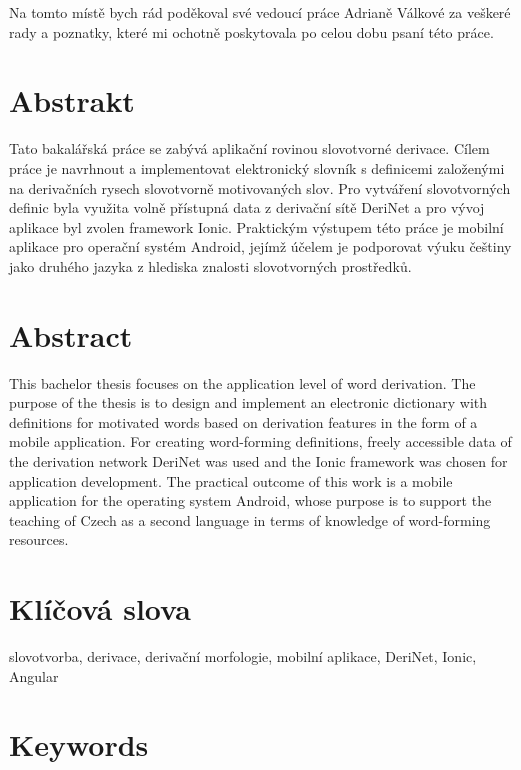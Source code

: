 \documentclass[a4paper,12pt,openany,twoside]{book} %
\begin{document}
\par
\par\vspace*{\fill}

Na tomto místě bych rád poděkoval své vedoucí práce Adrianě Válkové za veškeré rady a poznatky, které mi ochotně poskytovala po celou dobu psaní této práce.

\clearpage

\section*{Abstrakt}

Tato bakalářská práce se zabývá aplikační rovinou slovotvorné derivace. Cílem práce je navrhnout a implementovat elektronický slovník s definicemi založenými na derivačních rysech slovotvorně motivovaných slov. Pro vytváření slovotvorných definic byla využita volně přístupná data z derivační sítě DeriNet a pro vývoj aplikace byl zvolen framework Ionic. Praktickým výstupem této práce je mobilní aplikace pro operační systém Android, jejímž účelem je podporovat výuku češtiny jako druhého jazyka z hlediska znalosti slovotvorných prostředků.

\section*{Abstract}

This bachelor thesis focuses on the application level of word derivation. The purpose of the thesis is to design and implement an electronic dictionary with definitions for motivated words based on derivation features in the form of a mobile application. For creating word-forming definitions, freely accessible data of the derivation network DeriNet was used and the Ionic framework was chosen for application development. The practical outcome of this work is a mobile application for the operating system Android, whose purpose is to support the teaching of Czech as a second language in terms of knowledge of word-forming resources.


\section*{Klíčová slova}

slovotvorba, derivace, derivační morfologie, mobilní aplikace, DeriNet, Ionic, Angular

\section*{Keywords}
\end{document}
